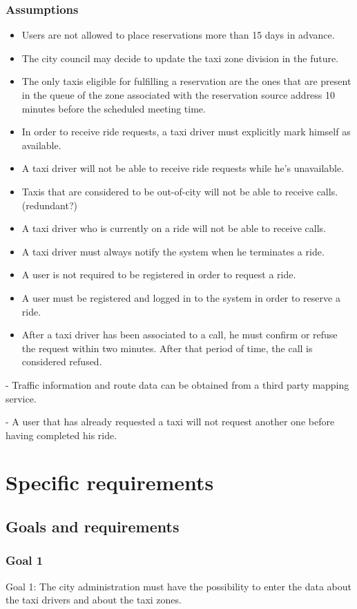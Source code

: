 \documentclass{book}
\begin{document}
\subsection{Assumptions}
\begin{itemize}
\item Users are not allowed to place reservations more than 15 days in advance. 
\item The city council may decide to update the taxi zone division in the future. 
\item The only taxis eligible for fulfilling a reservation are the ones that are present in the queue of the zone associated with the reservation source address 10 minutes before the scheduled meeting time.
\item In order to receive ride requests, a taxi driver must explicitly mark himself as available.
\item A taxi driver will not be able to receive ride requests while he’s unavailable.
\item Taxis that are considered to be out-of-city will not be able to receive calls. (redundant?)
\item A taxi driver who is currently on a ride will not be able to receive calls.
\item A taxi driver must always notify the system when he terminates a ride. 
\item A user is not required to be registered in order to request a ride.
\item A user must be registered and logged in to the system in order to reserve a ride.
\item After a taxi driver has been associated to a call, he must confirm or refuse the request within two minutes. After that period of time, the call is considered refused. 
\end{itemize}

- Traffic information and route data can be obtained from a third party mapping service.

- A user that has already requested a taxi will not request another one before having completed his ride.

\chapter{Specific requirements}
\section{Goals and requirements}
\subsection{Goal 1}
Goal 1: The city administration must have the possibility to enter the data about the taxi drivers and about the taxi zones. 
\end{document}
